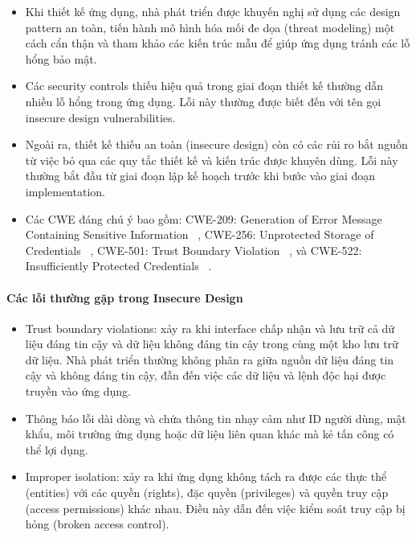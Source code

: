 \begin{itemize}
    \item Khi thiết kế ứng dụng, nhà phát triển được khuyến nghị sử dụng các design pattern an toàn, tiến hành mô hình hóa mối đe dọa (threat modeling) một cách cẩn thận và tham khảo các kiến trúc mẫu để giúp ứng dụng tránh các lỗ hổng bảo mật.
    \item Các security controls thiếu hiệu quả trong giai đoạn thiết kế thường dẫn nhiều lỗ hổng trong ứng dụng. Lỗi này thường được biết đến với tên gọi insecure design vulnerabilities.
    \item Ngoài ra, thiết kế thiếu an toàn (insecure design) còn có các rủi ro bắt nguồn từ việc bỏ qua các quy tắc thiết kế và kiến trúc được khuyên dùng. Lỗi này thường bắt đầu từ giai đoạn lập kế hoạch trước khi bước vào giai đoạn implementation.
    \item Các CWE đáng chú ý bao gồm: CWE-209: Generation of Error Message Containing Sensitive Information ~\cite{chap2bib19}, CWE-256: Unprotected Storage of Credentials ~\cite{chap2bib20}, CWE-501: Trust Boundary Violation ~\cite{chap2bib21}, và CWE-522: Insufficiently Protected Credentials ~\cite{chap2bib22}.
\end{itemize}

\paragraph{Các lỗi thường gặp trong Insecure Design ~\cite{chap2bib18}}

\begin{itemize}
    \item Trust boundary violations: xảy ra khi interface chấp nhận và lưu trữ cả dữ liệu đáng tin cậy và dữ liệu không đáng tin cậy trong cùng một kho lưu trữ dữ liệu. Nhà phát triển thường không phân ra giữa nguồn dữ liệu đáng tin cậy và không đáng tin cậy, đẫn đến việc các dữ liệu và lệnh độc hại được truyền vào ứng dụng.
    \item Thông báo lỗi dài dòng và chứa thông tin nhạy cảm như ID người dùng, mật khẩu, môi trường ứng dụng hoặc dữ liệu liên quan khác mà kẻ tấn công có thể lợi dụng.
    \item Improper isolation: xảy ra khi ứng dụng không tách ra được các thực thể (entities) với các quyền (rights), đặc quyền (privileges) và quyền truy cập (access permissions) khác nhau. Điều này dẫn đến việc kiểm soát truy cập bị hỏng (broken access control).
\end{itemize}

